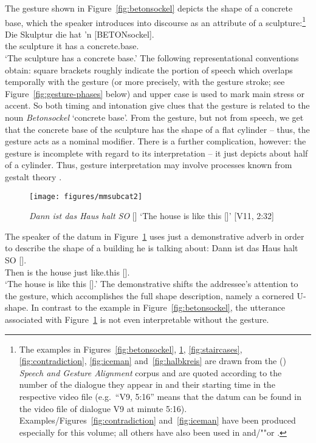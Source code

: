 \documentclass[output=paper
 	        ,biblatex
                ,babelshorthands
                ,newtxmath
                ,draftmode
                ,colorlinks, citecolor=brown
]{langscibook}
\begin{document}
The gesture shown in Figure~\ref{fig:betonsockel} depicts the shape of a concrete base, which the speaker introduces into discourse as an attribute of a sculpture:\footnote{The examples in Figures~\ref{fig:betonsockel}, \ref{fig:so}, \ref{fig:staircases}, \ref{fig:contradiction}, \ref{fig:iceman} and~\ref{fig:halbkreis} are drawn from the () \emph{Speech and Gesture Alignment} corpus \citep[,][]{Luecking:Bergmann:Hahn:Kopp:Rieser:2010} and are quoted according to the number of the dialogue they appear in and their starting time in the respective video file (e.g.\ \enquote{V9, 5:16} means that the datum can be found in the video file of dialogue V9 at minute 5:16). Examples/Figures~\ref{fig:contradiction} and~\ref{fig:iceman} have been produced especially for this volume; all others have also been used in \citet{Luecking:2013:a} and/""or \citet{Luecking:2016}.}
%
\ea \label{ex:betonsockel}
\gll Die Skulptur die hat 'n [BETONsockel]. \\
     the sculpture it has a concrete.base. \\
\glt \enquote*{The sculpture has a concrete base.}
\z
%
The following representational conventions obtain: square brackets roughly indicate the portion of speech which overlaps temporally with the gesture (or more precisely, with the gesture stroke; see Figure~\ref{fig:gesture-phases} below) and upper case is used to mark main stress or accent.
%
So both timing and intonation give clues that the gesture is related to the noun \emph{Betonsockel} `concrete base'.
%
From the gesture, but not from speech, we get that the concrete base of the sculpture has the shape of a flat cylinder -- thus, the gesture acts as a nominal modifier.
%
There is a further complication, however: the gesture is incomplete with regard to its interpretation -- it just depicts about half of a cylinder. 
%
Thus, gesture interpretation may involve processes known from gestalt theory \citetext{see \citealp{Luecking:2016} on a \emph{good continuation} constraint relevant to (\ref{ex:betonsockel})/Figure~\ref{fig:betonsockel}}.


\begin{figure}
  \centering
  \texttt{[image: figures/mmsubcat2]}
  \caption[Like this]{\textit{Dann ist das Haus halt SO} [] \enquote*{The house is like this []} [V11, 2:32]}
  \label{fig:so}
\end{figure}

The speaker of the datum in Figure~\ref{fig:so} uses just a demonstrative adverb in order to describe the shape of a building he is talking about:
%
\ea \label{ex:so}
\gll Dann ist das Haus halt {SO} {[]}. \\
     Then is the house just like.this {[]}. \\
\glt \enquote*{The house is like this [].} 
\z
%
The demonstrative shifts the addressee's attention to the gesture, which accomplishes the full shape description, namely a cornered U-shape.
%
In contrast to the example in Figure~\ref{fig:betonsockel}, the utterance associated with Figure~\ref{fig:so} is not even interpretable without the gesture.
\end{document}
